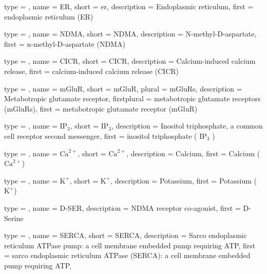 {
	type        = \acronymtype,
	name        = {ER},
	short       = {er},
	description = {Endoplasmic reticulum},
	first       = {endoplasmic reticulum (ER)}
}

{
	type        = \acronymtype,
	name        = {NDMA},
	short       = {NDMA},
	description = {N-methyl-D-aspartate},
	first       = {n-methyl-D-aspartate (NDMA)}
}

{
	type        = \acronymtype,
	name        = {CICR},
	short       = {CICR},
	description = {Calcium-induced calcium release},
	first       = {calcium-induced calcium release (CICR)}
}

{
	type        = \acronymtype,
	name        = {mGluR},
	short       = {mGluR},
    plural      = {mGluRs},
	description = {Metabotropic glutamate receptor},
	firstplural = {metabotropic glutamate receptors (mGluRs)},
	first       = {metabotropic glutamate receptor (mGluR)}
}

{
	type        = \acronymtype,
	name        = {$\textrm{IP}_3$},
	short       = {$\textrm{IP}_3$},
	description = {Inositol triphosphate, a common cell receptor second messenger},
	first = {inositol triphosphate ( $\textrm{IP}_3$ )}
}

{
	type        = \acronymtype,
    name        = {$\textrm{Ca}^{2+}$},
	short       = {$\textrm{Ca}^{2+}$},
	description = {Calcium},
	first = {Calcium ($\textrm{Ca}^{2+}$)}
}

{
	type        = \acronymtype,
	name        = {$\textrm{K}^{+}$},
	short       = {$\textrm{K}^{+}$},
	description = {Potassium},
	first = {Potassium ($\textrm{K}^{+}$)}
}

{
	type        = \acronymtype,
	name        = {D-SER},
	description = {NDMA receptor co-agonist},
	first       = {D-Serine}
}

{
	type        = \acronymtype,
	name        = {SERCA},
	short       = {SERCA},
	description = {Sarco endoplasmic reticulum ATPase pump: a cell membrane embedded pump requiring ATP},
  	first = {sarco endoplasmic reticulum ATPase (SERCA): a cell membrane embedded pump requiring ATP},   
}
